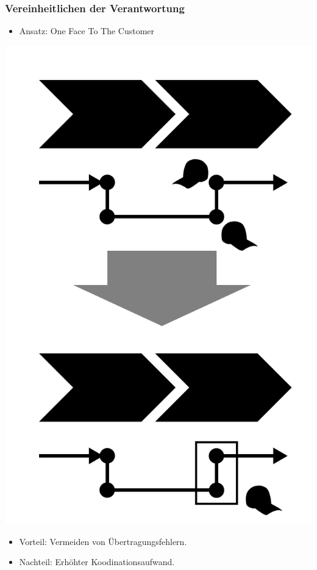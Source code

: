 \documentclass{beamer}
\begin{document}
 \begin{frame}
  \frametitle{Vereinheitlichen der Verantwortung}
  \begin{itemize}
    \item Ansatz: \glqq One Face To The Customer\grqq
  \end{itemize}
  \centerline{\includegraphics[scale=2.5]{4_6_8.png}}
  \begin{itemize}
    \item Vorteil: Vermeiden von Übertragungsfehlern.
    \item Nachteil: Erhöhter Koodinationsaufwand.
  \end{itemize}
 \end{frame}
\end{document}
